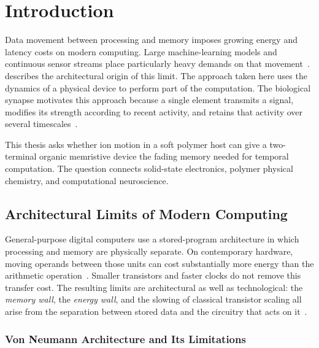 \documentclass[12pt, twoside]{report}
\begin{document}
\fi

\chapter{Introduction}\label{ch:intro}

Data movement between processing and memory imposes growing energy and latency costs on modern computing. Large machine-learning models and continuous sensor streams place particularly heavy demands on that movement~\cite{LeCun2015}.  describes the architectural origin of this limit. The approach taken here uses the dynamics of a physical device to perform part of the computation. The biological synapse motivates this approach because a single element transmits a signal, modifies its strength according to recent activity, and retains that activity over several timescales~\cite{AbbottRegehr2004}.

This thesis asks whether ion motion in a soft polymer host can give a two-terminal organic memristive device the fading memory needed for temporal computation. The question connects solid-state electronics, polymer physical chemistry, and computational neuroscience.


\section{Architectural Limits of Modern Computing}\label{sec:crisis}

General-purpose digital computers use a stored-program architecture in which processing and memory are physically separate. On contemporary hardware, moving operands between those units can cost substantially more energy than the arithmetic operation~\cite{Horowitz2014,HennessyPatterson2017}. Smaller transistors and faster clocks do not remove this transfer cost. The resulting limits are architectural as well as technological: the \textit{memory wall}, the \textit{energy wall}, and the slowing of classical transistor scaling all arise from the separation between stored data and the circuitry that acts on it~\cite{WulfMcKee1995,Hennessy2019}.

\subsection{Von Neumann Architecture and Its Limitations}\label{subsec:vonneumann}
\end{document}
